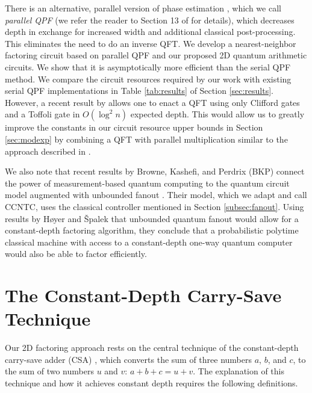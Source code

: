 \documentclass[twoside]{article}
\begin{document}
There is an alternative, parallel version of phase estimation 
\cite{Cleve2000,Kitaev2002}, which we call \emph{parallel QPF} (we refer the reader to Section 13 of \cite{Kitaev2002} for details), which decreases depth in exchange
for increased width and additional classical post-processing.
This eliminates the need to do an inverse QFT.
We develop a nearest-neighbor factoring circuit based on parallel QPF and our proposed 2D quantum arithmetic circuits.
We show that it is asymptotically more efficient than the serial QPF method. 
We compare the circuit resources required by our work with existing serial QPF implementations in Table
\ref{tab:results} of Section \ref{sec:results}.
However, a recent result by \cite{Jones2013} allows one to enact a
QFT using only Clifford gates and a Toffoli gate in $O(\log^2 n)$ expected depth.
This would allow us to
greatly improve the constants in our circuit resource upper bounds in Section \ref{sec:modexp} by combining a QFT with parallel multiplication similar to
the approach described in \cite{VanMeter2005,Cleve2000}.


We also note that recent results by Browne, Kashefi, and Perdrix (BKP) connect the power of
measurement-based quantum computing to the quantum circuit model augmented with
unbounded fanout \cite{Browne2009}. Their model, which we adapt and call
\textsc{CCNTC}, uses the classical controller mentioned in Section \ref{subsec:fanout}.
Using results by H{\o}yer and {\v S}palek \cite{Hoyer2002} that
unbounded quantum fanout would allow for a constant-depth factoring algorithm,
they conclude that a probabilistic polytime classical machine with access
to a constant-depth one-way quantum computer would also be able to factor
efficiently.

%
\section{The Constant-Depth Carry-Save Technique}
\label{sec:csa}

Our 2D factoring approach rests on the central technique of the constant-depth
carry-save adder (CSA) \cite{Gossett1998}, which converts the sum of three
numbers $a$, $b$, and $c$, to the sum of two numbers $u$ and $v$:
$a+b+c = u+v$. The explanation of this technique and how it achieves constant depth requires the following definitions.
\end{document}
